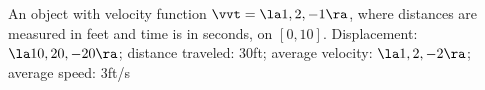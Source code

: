 {An object with velocity function $\vvt = \la 1,2,-1\ra$, where distances are measured in feet and time is in seconds, on $[0,10]$.
}
{Displacement: $\la 10,20,-20\ra$; distance traveled: $30$ft; average velocity: $\la 1,2,-2\ra$; average speed: $3$ft/s
}